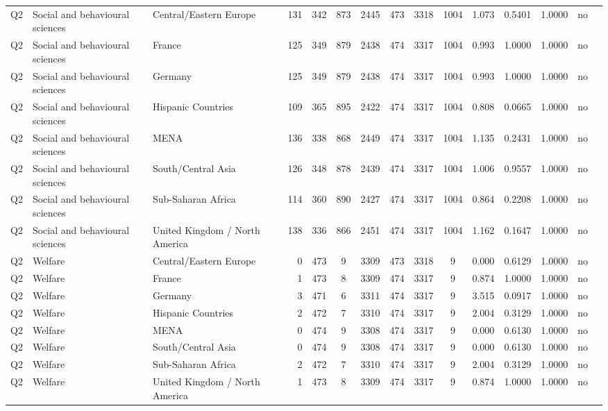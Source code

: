 \begin{longtable}{lllrcccccccccll}
Q2 & Social and behavioural sciences & Central/Eastern Europe & 131 & 342 & 873 & 2445 & 473 & 3318 & 1004 & 1.073 & 0.5401 & 1.0000 & no \\
Q2 & Social and behavioural sciences & France & 125 & 349 & 879 & 2438 & 474 & 3317 & 1004 & 0.993 & 1.0000 & 1.0000 & no \\
Q2 & Social and behavioural sciences & Germany & 125 & 349 & 879 & 2438 & 474 & 3317 & 1004 & 0.993 & 1.0000 & 1.0000 & no \\
Q2 & Social and behavioural sciences & Hispanic Countries & 109 & 365 & 895 & 2422 & 474 & 3317 & 1004 & 0.808 & 0.0665 & 1.0000 & no \\
Q2 & Social and behavioural sciences & MENA & 136 & 338 & 868 & 2449 & 474 & 3317 & 1004 & 1.135 & 0.2431 & 1.0000 & no \\
Q2 & Social and behavioural sciences & South/Central Asia & 126 & 348 & 878 & 2439 & 474 & 3317 & 1004 & 1.006 & 0.9557 & 1.0000 & no \\
Q2 & Social and behavioural sciences & Sub-Saharan Africa & 114 & 360 & 890 & 2427 & 474 & 3317 & 1004 & 0.864 & 0.2208 & 1.0000 & no \\
Q2 & Social and behavioural sciences & United Kingdom / North America & 138 & 336 & 866 & 2451 & 474 & 3317 & 1004 & 1.162 & 0.1647 & 1.0000 & no \\
Q2 & Welfare & Central/Eastern Europe & 0 & 473 & 9 & 3309 & 473 & 3318 & 9 & 0.000 & 0.6129 & 1.0000 & no \\
Q2 & Welfare & France & 1 & 473 & 8 & 3309 & 474 & 3317 & 9 & 0.874 & 1.0000 & 1.0000 & no \\
Q2 & Welfare & Germany & 3 & 471 & 6 & 3311 & 474 & 3317 & 9 & 3.515 & 0.0917 & 1.0000 & no \\
Q2 & Welfare & Hispanic Countries & 2 & 472 & 7 & 3310 & 474 & 3317 & 9 & 2.004 & 0.3129 & 1.0000 & no \\
Q2 & Welfare & MENA & 0 & 474 & 9 & 3308 & 474 & 3317 & 9 & 0.000 & 0.6130 & 1.0000 & no \\
Q2 & Welfare & South/Central Asia & 0 & 474 & 9 & 3308 & 474 & 3317 & 9 & 0.000 & 0.6130 & 1.0000 & no \\
Q2 & Welfare & Sub-Saharan Africa & 2 & 472 & 7 & 3310 & 474 & 3317 & 9 & 2.004 & 0.3129 & 1.0000 & no \\
Q2 & Welfare & United Kingdom / North America & 1 & 473 & 8 & 3309 & 474 & 3317 & 9 & 0.874 & 1.0000 & 1.0000 & no \\
\end{longtable}
